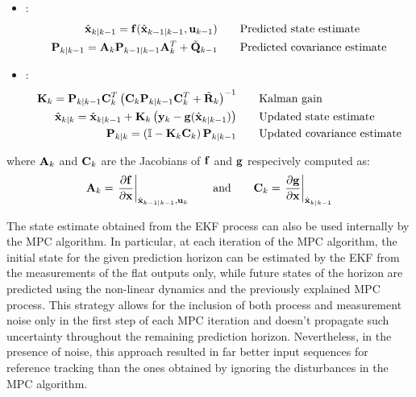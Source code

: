 \documentclass[../main.tex]{subfiles}
\begin{document}
\begin{itemize}
	\item {}:
	\begin{equation}\label{eq:ekf-prediction}
		\begin{aligned}
			\hat{\mathbf{x}}_{k | k-1} = \mathbf{f}(\hat{\mathbf{x}}_{k-1 | k-1},
			\mathbf{u}_{k-1}) \quad & \quad \text{Predicted state estimate} \\
			\mathbf{P}_{k | k-1} = \mathbf{A}_k \mathbf{P}_{k-1 | k-1} \mathbf{A}_k^T +
			\tilde{\mathbf{Q}}_{k - 1} \quad & \quad \text{Predicted covariance estimate}
		\end{aligned}
	\end{equation}

\item {}:
	\begin{equation}\label{eq:ekf-update}
		\begin{aligned}
			\mathbf{K}_k = \mathbf{P}_{k | k-1} \mathbf{C}_k^T \left(
				\mathbf{C}_k \mathbf{P}_{k | k-1} \mathbf{C}_k^T + \tilde{\mathbf{R}}_k
			\right)^{-1} \quad & \quad \text{Kalman gain} \\
			\hat{\mathbf{x}}_{k | k} = \hat{\mathbf{x}}_{k | k-1} + \mathbf{K}_k \left(
								\mathbf{y}_k - \mathbf{g}(\hat{\mathbf{x}}_{k | k-1})
				\right) \quad & \quad \text{Updated state estimate} \\
				\mathbf{P}_{k | k} = \left( \mathbb{I} - \mathbf{K}_k \mathbf{C}_k \right)
				\mathbf{P}_{k | k-1} \quad & \quad \text{Updated covariance
				estimate}
		\end{aligned}
	\end{equation}
\end{itemize}

where $\mathbf{A}_k$ and $\mathbf{C}_k$ are the Jacobians of $\mathbf{f}$ and $\mathbf{g}$
respecively computed as:
\begin{equation*}
		\mathbf{A}_k = \left. \frac{\partial \mathbf{f}}{\partial \mathbf{x}}
			\right|_{\hat{\mathbf{x}}_{k-1 | k-1}, \mathbf{u}_{k}} \quad\quad
			\text{and} \quad\quad
		\mathbf{C}_k = \left. \frac{\partial \mathbf{g}}{\partial \mathbf{x}} \right|_{\hat{\mathbf{x}}_{k | k-1}}
\end{equation*}

The state estimate obtained from the EKF process can also be used internally by
the MPC algorithm. In particular, at each iteration of
the MPC algorithm, the initial state for the given prediction horizon can be
estimated by the EKF from the measurements of the flat outputs only, while future states of
the horizon are predicted using the non-linear dynamics and the previously
explained MPC process.
This strategy allows for the inclusion of both process and measurement noise
only in the first step of each MPC iteration and doesn't propagate such
uncertainty throughout the remaining prediction horizon. Nevertheless, in the
presence of noise, this approach resulted in far better input sequences for
reference tracking than
the ones obtained by ignoring the disturbances in the MPC algorithm.
\end{document}
